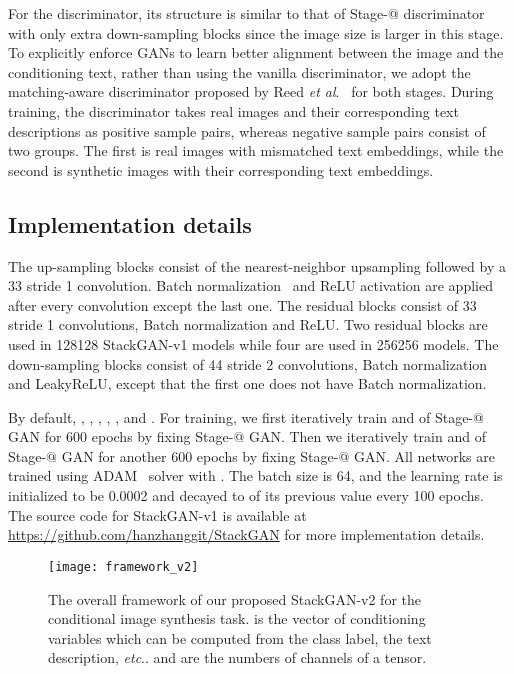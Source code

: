 \documentclass[10pt,journal,letterpaper,compsoc]{IEEEtran}
\makeatletter
\newcommand{\Rmnum}[1]{\expandafter\@slowromancap\romannumeral #1@}
\makeatother
\begin{document}
For the discriminator, its structure is similar to that of Stage-\Rmnum{1} discriminator with only extra down-sampling blocks since the image size is larger in this stage.  
To explicitly enforce GANs to learn better alignment between the image and the conditioning text, rather than using the vanilla discriminator, we adopt the matching-aware discriminator proposed by Reed \emph{et al}.~\cite{reed2016generative} for both stages. 
During training, the discriminator takes real images and their corresponding text descriptions as positive sample pairs, whereas negative sample pairs consist of two groups. 
The first is real images with mismatched text embeddings, while the second is synthetic images with their corresponding text embeddings. 

\vspace{-2pt}


\subsection{Implementation details}
{
The up-sampling blocks consist of the nearest-neighbor upsampling followed by a 33 stride 1 convolution. Batch normalization~\cite{IoffeS15} and ReLU activation are applied after every convolution except the last one.  The residual blocks consist of  33 stride 1 convolutions, Batch normalization and ReLU. Two residual blocks are used in 128128 StackGAN-v1 models while four are used in 256256 models. The down-sampling blocks consist of 44 stride 2 convolutions, Batch normalization and LeakyReLU, except that the first one does not have Batch normalization.

By default, ,  , ,  , ,   and . 
For training, we first iteratively train  and  of Stage-\Rmnum{1} GAN for 600 epochs by fixing Stage-\Rmnum{2} GAN. Then we iteratively train  and  of Stage-\Rmnum{2} GAN for another 600 epochs by fixing Stage-\Rmnum{1} GAN. All networks are trained using ADAM~\cite{KingmaB14} solver with . The batch size is 64, and the learning rate is initialized to be 0.0002 and decayed to  of its previous value every 100 epochs. The source code for StackGAN-v1 is available at {\href{https://github.com/hanzhanggit/StackGAN}{https://github.com/hanzhanggit/StackGAN}} for more implementation details.
}



\begin{figure*}[tb]
\centering
\texttt{[image: framework\_v2]}
\vspace{-12pt}
\caption{The overall framework of our proposed StackGAN-v2 for the conditional image synthesis task.  is the vector of conditioning variables which can be computed from the class label, the text description, \emph{etc}..  and  are the numbers of channels of a tensor.}
\vspace{-10pt}
\label{fig:StackGAN-v2}
\end{figure*}
\end{document}
